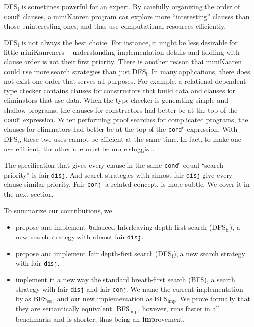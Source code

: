 \documentclass[format=acmlarge, review=true, authordraft=true]{acmart}
\newcommand{\conde}{\texttt{cond$^e$}}
\newcommand{\conj}{\texttt{conj}}
\newcommand{\disj}{\texttt{disj}}
\newcommand{\DFSi }[0]{DFS$_\textrm{i}$}
\newcommand{\DFSf }[0]{DFS$_\textrm{f}$}
\newcommand{\DFSbi}[0]{DFS$_\textrm{bi}$}
\newcommand{\BFS}[0]{BFS}
\newcommand{\BFSser}[0]{BFS$_\textrm{ser}$}
\newcommand{\BFSimp}[0]{BFS$_\textrm{imp}$}
\begin{document}

\DFSi{} is sometimes powerful for an expert. By carefully organizing the order 
of \conde{} clauses, a miniKanren program can explore more ``interesting'' 
clauses than those uninteresting ones, and thus use computational resources 
efficiently.


\DFSi{} is not always the best choice. For instance, it might be less 
desirable for little miniKanreners -- understanding implementation details and 
fiddling with clause order is not their first priority. 
There is another reason that miniKanren could use more search strategies than
just \DFSi. In many applications, there does not exist one order that serves all
purposes. For example, a relational dependent type checker contains
clauses for constructors that build data and clauses for eliminators that use
data. When the type checker is generating simple and shallow programs,
the clauses for constructors had better be at the top of the
\conde{} expression.
When performing proof searches for complicated programs, the clauses for 
eliminators had better be at the top of the \conde{} expression. With \DFSi, 
these two uses cannot be efficient at the same time. In fact, to make one use 
efficient, the other one must be more sluggish.

The specification that gives every clause in the same \conde{} equal 
``search priority'' is fair \disj{}. And search strategies with 
almost-fair \disj{} give every clause similar priority. 
Fair \conj{}, a related concept, is more subtle. We cover it in the next 
section.

To summarize our contributions, we
\begin{itemize}
	\item propose and implement \textbf{b}alanced \textbf{i}nterleaving 
depth-first search (\DFSbi{}), a new search strategy with almost-fair \disj{}.
	\item propose and implement \textbf{f}air depth-first search (\DFSf{}), 
a new search strategy with fair \disj{}.
	\item implement in a new way the standard breath-first search (\BFS), a 
search strategy with fair \disj{} and fair \conj{}. We name the current 
implementation by \citeauthor{seres1999algebra} as \BFSser{}, and our 
new implementation as \BFSimp{}. We prove formally that they are semantically 
equivalent. \BFSimp{}, however, runs faster in all benchmarks and is shorter, 
thus being an \textbf{imp}rovement. 
\end{itemize}
\end{document}
